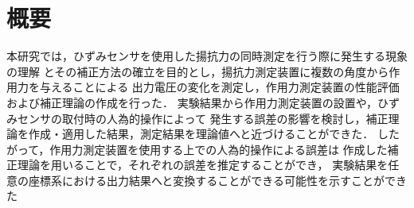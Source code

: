 
\maketitle
\section*{概要}

本研究では，ひずみセンサを使用した揚抗力の同時測定を行う際に発生する現象の理解
とその補正方法の確立を目的とし，揚抗力測定装置に複数の角度から作用力を与えることによる
出力電圧の変化を測定し，作用力測定装置の性能評価および補正理論の作成を行った．
実験結果から作用力測定装置の設置や，ひずみセンサの取付時の人為的操作によって
発生する誤差の影響を検討し，補正理論を作成・適用した結果，測定結果を理論値へと近づけることができた．
したがって，作用力測定装置を使用する上での人為的操作による誤差は
作成した補正理論を用いることで，それぞれの誤差を推定することができ，
実験結果を任意の座標系における出力結果へと変換することができる可能性を示すことができた

\newpage
\setcounter{tocdepth}{2}
\tableofcontents
\newpage

